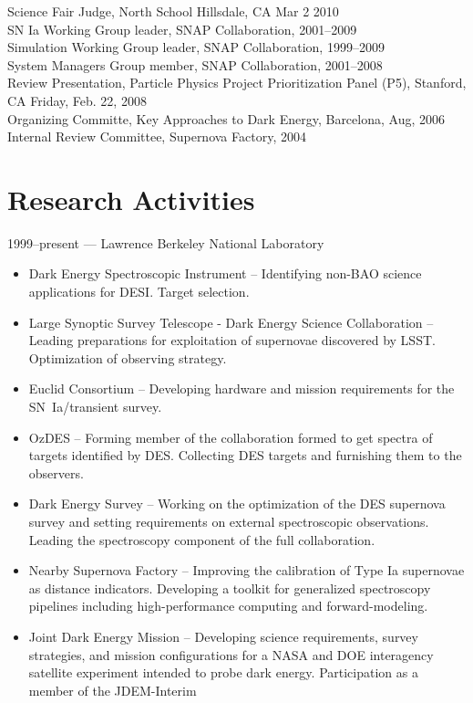 \documentclass[line, margin]{res}
\begin{document}
\begin{resume}
Science Fair Judge, North School Hillsdale, CA Mar 2 2010\\
SN Ia Working Group leader, SNAP Collaboration, 2001--2009\\
Simulation Working Group leader, SNAP Collaboration, 1999--2009\\
System Managers Group member, SNAP Collaboration, 2001--2008\\
Review Presentation, Particle Physics Project Prioritization Panel (P5), Stanford, CA Friday, Feb. 22, 2008\\
Organizing Committe, Key Approaches to Dark Energy, Barcelona,  Aug, 2006\\
Internal Review Committee, Supernova Factory, 2004

\section{Research Activities}
1999--present --- Lawrence Berkeley National Laboratory
\begin{itemize}
\item Dark Energy Spectroscopic Instrument -- Identifying non-BAO science applications for DESI.   Target selection. 
\item Large Synoptic Survey Telescope - Dark Energy Science Collaboration -- Leading preparations for 
exploitation of supernovae discovered by LSST.  Optimization of observing strategy.
\item Euclid Consortium -- Developing hardware and mission requirements for the SN~Ia/transient survey.
\item OzDES -- Forming member of the collaboration formed to get spectra of targets identified by DES.  Collecting
DES targets and furnishing them to the observers.
\item Dark Energy Survey -- Working on the optimization of the DES supernova survey and setting requirements
on external spectroscopic observations. Leading the spectroscopy component of the full collaboration.
\item Nearby Supernova Factory -- Improving the calibration of Type Ia supernovae as distance indicators.  Developing
a toolkit for generalized spectroscopy pipelines including high-performance computing and forward-modeling.
\item Joint Dark Energy Mission -- Developing science requirements, survey strategies, and mission configurations for
a NASA and DOE interagency satellite experiment intended to probe dark energy.  Participation as a member of the JDEM-Interim

\end{itemize}
\end{resume}
\end{document}

